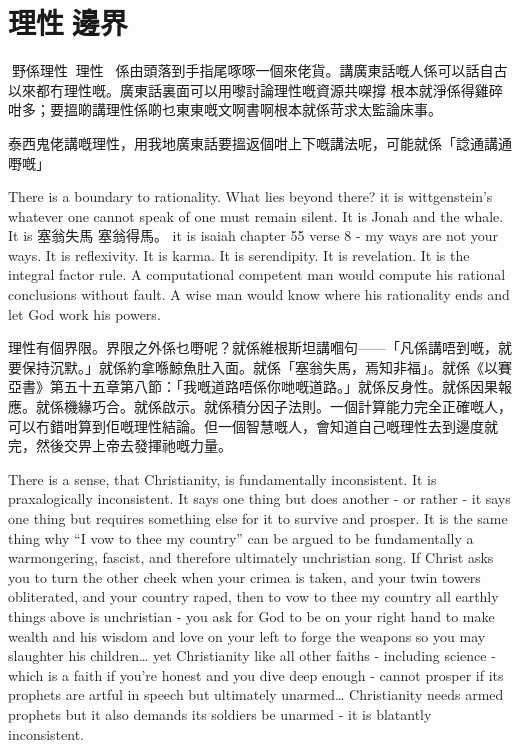 \chapter{理性󱝚邊界}

野係理性？理性係由頭落到手指尾啄啄一個來佬貨。講廣東話嘅人係可以話自古以來都冇理性嘅。廣東話裏面可以用嚟討論理性嘅資源共㗎撐 根本就淨係得雞碎咁多；要搵啲講理性係啲乜東東嘅文啊書啊根本就係苛求太監論床事。

泰西鬼佬講嘅理性，用我地廣東話要搵返個咁上下嘅講法呢，可能就係「諗通講通嘢嘅」



There is a boundary to rationality. What lies beyond there? it is wittgenstein’s whatever one cannot speak of one must remain silent. It is Jonah and the whale. It is 塞翁失馬 塞翁得馬。 it is isaiah chapter 55 verse 8 - my ways are not your ways. It is reflexivity. It is karma. It is serendipity. It is revelation. It is the integral factor rule. A computational competent man would compute his rational conclusions without fault. A wise man would know where his rationality ends and let God work his powers. 


理性有個界限。界限之外係乜嘢呢？就係維根斯坦講嗰句——「凡係講唔到嘅，就要保持沉默。」就係約拿喺鯨魚肚入面。就係「塞翁失馬，焉知非福」。就係《以賽亞書》第五十五章第八節：「我嘅道路唔係你哋嘅道路。」就係反身性。就係因果報應。就係機緣巧合。就係啟示。就係積分因子法則。一個計算能力完全正確嘅人，可以冇錯咁算到佢嘅理性結論。但一個智慧嘅人，會知道自己嘅理性去到邊度就完，然後交畀上帝去發揮祂嘅力量。



There is a sense, that Christianity, is fundamentally inconsistent. It is praxalogically inconsistent. It says one thing but does another - or rather - it says one thing but requires something else for it to survive and prosper. It is the same thing why “I vow to thee my country” can be argued to be fundamentally a warmongering, fascist, and therefore ultimately unchristian song. If Christ asks you to turn the other cheek when your crimea is taken, and your twin towers obliterated, and your country raped, then to vow to thee my country all earthly things above is unchristian - you ask for God to be on your right hand to make wealth and his wisdom and love on your left to forge the weapons so you may slaughter his children… yet Christianity like all other faiths - including science - which is a faith if you’re honest and you dive deep enough - cannot prosper if its prophets are artful in speech but ultimately unarmed… Christianity needs armed prophets but it also demands its soldiers be unarmed - it is blatantly inconsistent. 


